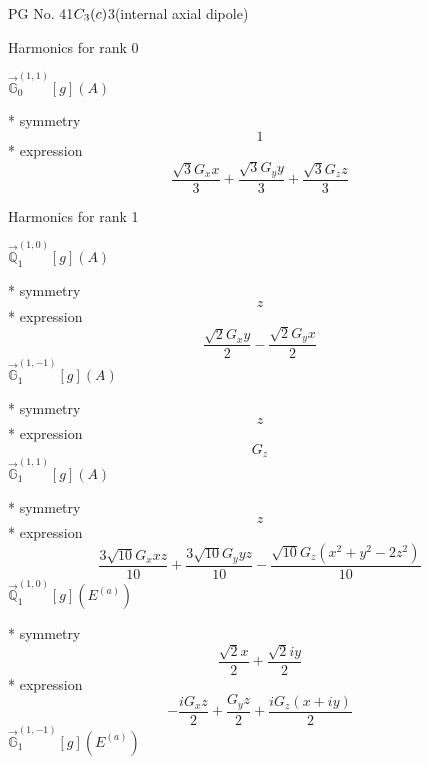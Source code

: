 \documentclass[fleqn,8pt]{jsarticle}
\begin{document}
\setcounter{MaxMatrixCols}{32}

\renewcommand{\tablename}{Table~}
\renewcommand{\figurename}{Figure~}
\begin{center}
\LARGE
PG No. 41\quad$C_{\rm 3}(c)$\quad$3$\quad[ trigonal ] (internal axial dipole)
\end{center}

\noindent * Harmonics for rank 0

\noindent\quad $\vec{\mathbb{G}}_{0}^{(1,1)}[g](A)$

\noindent\quad ** symmetry
\begin{dmath*}
1
\end{dmath*}
\noindent\quad ** expression
\begin{dmath*}
\frac{\sqrt{3} G_{x} x}{3} + \frac{\sqrt{3} G_{y} y}{3} + \frac{\sqrt{3} G_{z} z}{3}
\end{dmath*}

\noindent * Harmonics for rank 1

\noindent\quad $\vec{\mathbb{Q}}_{1}^{(1,0)}[g](A)$

\noindent\quad ** symmetry
\begin{dmath*}
z
\end{dmath*}
\noindent\quad ** expression
\begin{dmath*}
\frac{\sqrt{2} G_{x} y}{2} - \frac{\sqrt{2} G_{y} x}{2}
\end{dmath*}
\noindent\quad $\vec{\mathbb{G}}_{1}^{(1,-1)}[g](A)$

\noindent\quad ** symmetry
\begin{dmath*}
z
\end{dmath*}
\noindent\quad ** expression
\begin{dmath*}
G_{z}
\end{dmath*}
\noindent\quad $\vec{\mathbb{G}}_{1}^{(1,1)}[g](A)$

\noindent\quad ** symmetry
\begin{dmath*}
z
\end{dmath*}
\noindent\quad ** expression
\begin{dmath*}
\frac{3 \sqrt{10} G_{x} x z}{10} + \frac{3 \sqrt{10} G_{y} y z}{10} - \frac{\sqrt{10} G_{z} \left(x^{2} + y^{2} - 2 z^{2}\right)}{10}
\end{dmath*}
\noindent\quad $\vec{\mathbb{Q}}_{1}^{(1,0)}[g](E^{(a)})$

\noindent\quad ** symmetry
\begin{dmath*}
\frac{\sqrt{2} x}{2} + \frac{\sqrt{2} i y}{2}
\end{dmath*}
\noindent\quad ** expression
\begin{dmath*}
- \frac{i G_{x} z}{2} + \frac{G_{y} z}{2} + \frac{i G_{z} \left(x + i y\right)}{2}
\end{dmath*}
\noindent\quad $\vec{\mathbb{G}}_{1}^{(1,-1)}[g](E^{(a)})$
\end{document}
